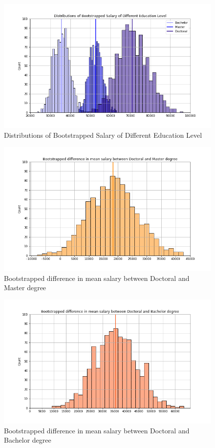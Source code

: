 \documentclass[10pt,onecolumn,letterpaper]{article}
\begin{document}
\begin{figure}[htbp]
  \centering
  \includegraphics[width=1\textwidth]{f22.png}
  \caption{Distributions of Bootstrapped Salary of Different Education Level}
\end{figure}

\begin{figure}[htbp]
  \centering
  \includegraphics[width=1\textwidth]{f23.png}
  \caption{Bootstrapped difference in mean salary between Doctoral and Master degree}
\end{figure}

\begin{figure}[htbp]
  \centering
  \includegraphics[width=1\textwidth]{f24.png}
  \caption{Bootstrapped difference in mean salary between Doctoral and Bachelor degree}
\end{figure}
\end{document}
